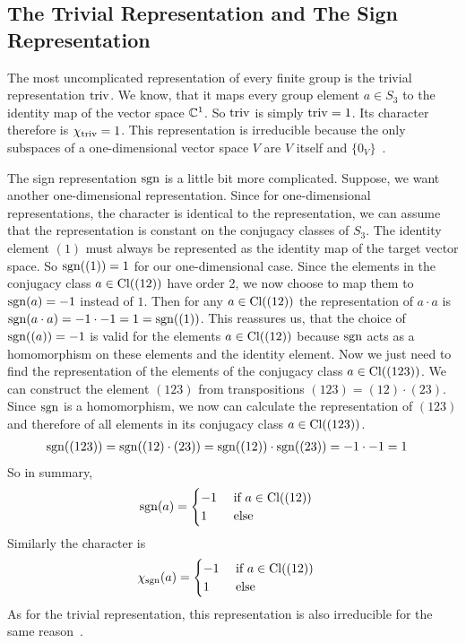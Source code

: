 \subsection{The Trivial Representation and The Sign Representation}

The most uncomplicated representation of every finite group is the trivial representation $\operatorname{triv}$.
We know, that it maps every group element $a \in S_3$ to the identity map of the vector space $\mathbb{C}^1$.
So $\operatorname{triv}$ is simply $\operatorname{triv} = 1$.
Its character therefore is $\chi_{\operatorname{triv}} = 1$.
This representation is irreducible because the only subspaces of a one-dimensional vector space $V$ are $V$ itself and $\{0_V\}$~\cite{fulton2013}.

The sign representation $\operatorname{sgn}$ is a little bit more complicated.
Suppose, we want another one-dimensional representation.
Since for one-dimensional representations, the character is identical to the representation, we can assume that the representation is constant on the conjugacy classes of $S_3$.
The identity element $(1)$ must always be represented as the identity map of the target vector space.
So $\operatorname{sgn}((1)) = 1$ for our one-dimensional case.
Since the elements in the conjugacy class $a \in \operatorname{Cl}((12))$ have order 2, we now choose to map them to $\operatorname{sgn}(a) = -1$ instead of $1$.
Then for any $a \in \operatorname{Cl}((12))$ the representation of $a \cdot a$ is $\operatorname{sgn}(a \cdot a) = -1 \cdot -1 = 1 = \operatorname{sgn}((1))$.
This reassures us, that the choice of $\operatorname{sgn}((a)) = -1$ is valid for the elements $a \in \operatorname{Cl}((12))$ because $\operatorname{sgn}$ acts as a homomorphism on these elements and the identity element.
Now we just need to find the representation of the elements of the conjugacy class $a \in \operatorname{Cl}((123))$.
We can construct the element $(123)$ from transpositions $(123) = (12) \cdot (23)$.
Since $\operatorname{sgn}$ is a homomorphism, we now can calculate the representation of $(123)$ and therefore of all elements in its conjugacy class $a \in \operatorname{Cl}((123))$.
\begin{align}
    \operatorname{sgn}((123)) & = \operatorname{sgn}((12) \cdot (23)) = \operatorname{sgn}((12)) \cdot \operatorname{sgn}((23))  = -1 \cdot -1 = 1
\end{align}
So in summary,
\begin{align}
    \operatorname{sgn}(a) & = \begin{cases}
        -1 & \text{ if } a \in \operatorname{Cl}((12)) \\
        1 & \text{ else}
    \end{cases}
\end{align}
Similarly the character is
\begin{align}
    \chi_{\operatorname{sgn}}(a) & = \begin{cases}
        -1 & \text{ if } a \in \operatorname{Cl}((12)) \\
        1 & \text{ else}
    \end{cases}
\end{align}
As for the trivial representation, this representation is also irreducible for the same reason~\cite{fulton2013}.

